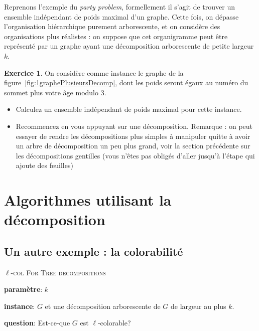 \documentclass[a4paper,12pt]{article}
\theoremstyle{definition}
\newtheorem{exo}{Exercice}%
\theoremstyle{remark}
\begin{document}
Reprenons l'exemple du \emph{party problem}, formellement il s'agit de
trouver un ensemble indépendant de poids maximal d'un graphe. Cette
fois, on dépasse l'organisation hiérarchique purement arborescente, et
on considère des organisations plus réalistes : on suppose que cet
organigramme peut être représenté par un graphe ayant une
décomposition arborescente de petite largeur $k$. 

\begin{exo}
  On considère comme instance le graphe de la
  figure~\ref{fig:1graphePlusieursDecomp}, dont les poids seront égaux
  au numéro du sommet plus votre âge modulo 3.

  \begin{itemize}
  \item 
    Calculez un ensemble indépendant de poids maximal pour cette instance.
  \item 
    Recommencez en vous appuyant sur une décomposition.
    Remarque : on
    peut essayer de rendre les décompositions plus simples à manipuler
    quitte à avoir un arbre de décomposition un peu plus grand, voir
    la section précédente sur les décompositions gentilles (vous n'êtes pas
    obligés d'aller jusqu'à l'étape qui ajoute des feuilles)
  \end{itemize}
\end{exo}


\section{Algorithmes utilisant la décomposition}

\subsection*{Un autre exemple : la colorabilité}
\label{sec:un-autre-exemple}

\begin{framed}\textsc{$\ell$-col For Tree decompositions}
  \begin{compactitem}
  \item \textbf{paramètre}: $k$
  \item \textbf{instance}: $G$ et une décomposition arborescente de
    $G$ de largeur au plus $k$.
  \item \textbf{question}: Est-ce-que $G$ est $\ell$-colorable? 
  \end{compactitem}
\end{framed}
\end{document}
